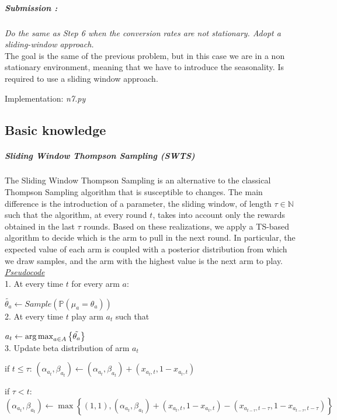 \subparagraph*{Submission : }
\textit{Do the same as Step 6 when the conversion rates are not stationary. Adopt a sliding-window approach.}\\

The goal is the same of the previous problem, but in this case we are in a non stationary environment, meaning that we have to introduce the seasonality. Is required to use a sliding window approach.

Implementation: \textit{n7.py}
\subsection*{Basic knowledge}
\subparagraph*{Sliding Window Thompson Sampling (SWTS)} 
The Sliding Window Thompson Sampling is an alternative to the classical Thompson Sampling algorithm that is susceptible to changes. The main difference is the introduction of a parameter, the sliding window, of length $\tau\in \mathbb{N}$ such that the algorithm, at every round $t$, takes into account only the rewards obtained in the last $\tau$ rounds. Based on these realizations, we apply a TS-based algorithm to decide which is the arm to pull in the next round. In particular, the expected value of each arm is coupled with a posterior distribution from which we draw samples, and the arm with the highest value is the next arm to play.\\

\underline{\textit{Pseudocode}}\\
1. At every time $t$ for every arm $a$:

\hspace{2em}$\tilde{\theta_{a}} \leftarrow Sample(\mathbb P(\mu_{a}=\theta_{a}))$ \\

2. At every time $t$ play arm $a_{t}$ such that 

\hspace{2em}$a_{t} \leftarrow \operatorname{arg\,max}_{a \in A} \left\{ \tilde{\theta_{a}}  \right\} $ \\

3.  Update beta distribution of arm $a_{t}$

\hspace{2em}if $t\leq\tau$: $(\alpha_{a_{t}}, \beta_{a_{t}}) \leftarrow (\alpha_{a_{t}}, \beta_{a_{t}}) + (x_{a_{t},t}, 1 - x_{a_{t},t})$ 

\hspace{2em}if $\tau<t$:	$(\alpha_{a_{t}}, \beta_{a_{t}}) \leftarrow \max \left\{(1,1), (\alpha_{a_{t}}, \beta_{a_{t}}) + (x_{a_{t},t}, 1 - x_{a_{t},t}) - (x_{a_{t-\tau},t-\tau}, 1 - x_{a_{t-\tau},t-\tau})    \right\}$

